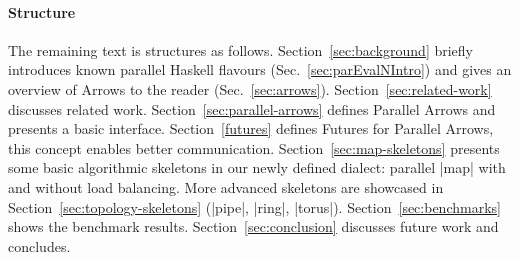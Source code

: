 \paragraph{Structure}
The remaining text is structures as follows. Section~\ref{sec:background} briefly introduces known parallel Haskell flavours (Sec.~\ref{sec:parEvalNIntro}) and gives an overview of Arrows to the reader (Sec.~\ref{sec:arrows}). Section~\ref{sec:related-work} discusses related work. Section~\ref{sec:parallel-arrows} defines Parallel Arrows and presents a basic interface. Section~\ref{futures} defines Futures for Parallel Arrows, this concept enables better communication. Section~\ref{sec:map-skeletons} presents some basic algorithmic skeletons  in our newly defined dialect: parallel |map| with and without load balancing. More advanced skeletons are showcased in Section~\ref{sec:topology-skeletons} (|pipe|, |ring|, |torus|). Section~\ref{sec:benchmarks} shows the benchmark results. Section~\ref{sec:conclusion} discusses future work and concludes.

